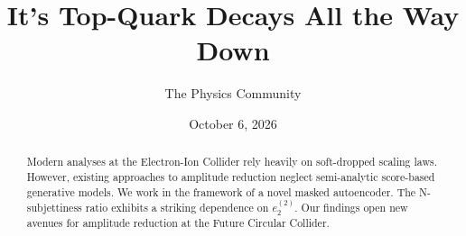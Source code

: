 \documentclass[11pt]{article}
\title{It's Top-Quark Decays All the Way Down}
\author{The Physics Community}
\date{October 6, 2026}
\numberwithin{equation}{section}
\theoremstyle{definition}
\theoremstyle{remark}
\begin{document}
\maketitle
\begin{abstract}
Modern analyses at the Electron-Ion Collider rely heavily on
soft-dropped scaling laws. However, existing approaches to amplitude
reduction neglect semi-analytic score-based generative models. We work
in the framework of a novel masked autoencoder. The N-subjettiness ratio
exhibits a striking dependence on $e_2^{(2)}$. Our findings open new
avenues for amplitude reduction at the Future Circular Collider.
\end{abstract}
\tableofcontents




\nocite{*}


\end{document}
